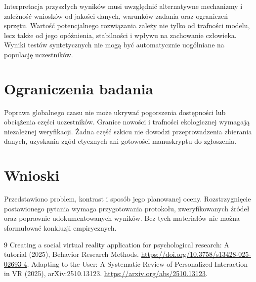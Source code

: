 \documentclass[11pt,a4paper]{article}
\begin{document}
Interpretacja przyszłych wyników musi uwzględnić alternatywne mechanizmy i zależność wniosków od jakości danych, warunków zadania oraz ograniczeń sprzętu. Wartość potencjalnego rozwiązania zależy nie tylko od trafności modelu, lecz także od jego opóźnienia, stabilności i wpływu na zachowanie człowieka. Wyniki testów syntetycznych nie mogą być automatycznie uogólniane na populację uczestników.

\section{Ograniczenia badania}

Poprawa globalnego czasu nie może ukrywać pogorszenia dostępności lub obciążenia części uczestników. Granice nowości i trafności ekologicznej wymagają niezależnej weryfikacji. Żadna część szkicu nie dowodzi przeprowadzenia zbierania danych, uzyskania zgód etycznych ani gotowości manuskryptu do zgłoszenia.

\section{Wnioski}

Przedstawiono problem, kontrast i sposób jego planowanej oceny. Rozstrzygnięcie postawionego pytania wymaga przygotowania protokołu, zweryfikowanych źródeł oraz poprawnie udokumentowanych wyników. Bez tych materiałów nie można sformułować konkluzji empirycznych.

\begin{thebibliography}{9}
 Creating a social virtual reality application for psychological research: A tutorial (2025), Behavior Research Methods. \url{https://doi.org/10.3758/s13428-025-02693-4}.
 Adapting to the User: A Systematic Review of Personalized Interaction in VR (2025), arXiv:2510.13123. \url{https://arxiv.org/abs/2510.13123}.
\end{thebibliography}
\end{document}
